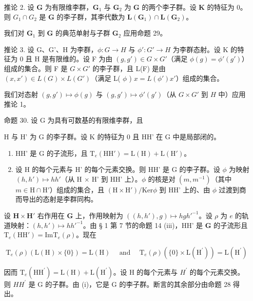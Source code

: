 推论 2. 设 \(\mathbf{G}\) 为有限维李群，\(\mathbf{G}_1\) 与 \(\mathbf{G}_2\) 为 \(\mathbf{G}\) 的两个李子群。设 \(\mathbf{K}\) 的特征为 0。则 \(G_1 \cap G_2\) 是 \(\mathbf{G}\) 的李子群，其李代数为 \(\mathbf{L}(\mathbf{G}_1) \cap \mathbf{L}(\mathbf{G}_2)\)。

我们对 \(\mathbf{G}_1\) 到 \(\mathbf{G}\) 的典范单射与子群 \(\mathbf{G}_2\) 应用命题 29。

推论 3. 设 G、G'、H 为李群，\(\phi: G \to H\) 与 \(\phi': G' \to H\) 为李群态射。设 K 的特征为 0 且 H 是有限维的。设 F 为由 \((g, g') \in G \times G'\)（满足 \(\phi(g) = \phi'(g')\)）组成的集合。则 F 是 \(G \times G'\) 的李子群，且 L(F) 是由 \((x, x') \in L(G) \times L(G')\)（满足 L( \(\phi\) ) \(x = L(\phi')x'\)）组成的集合。

我们对态射 \((g, g') \mapsto \phi(g)\) 与 \((g, g') \mapsto \phi'(g')\)（从 \(G \times G'\) 到 \(H\) 中）应用推论 1。

命题 30. 设 G 为具有可数基的有限维李群，且

H 与 H' 为 G 的李子群。设 K 的特征为 0 且 HH' 在 G 中是局部闭的。

\begin{enumerate}
\def\labelenumi{(\roman{enumi})}
\item
  HH' 是 G 的子流形，且 \(\mathrm{T}_{e}(\mathrm{HH}') = \mathrm{L}(\mathrm{H}) + \mathrm{L}(\mathrm{H}')\)。
\item
  设 H 的每个元素与 H' 的每个元素交换。则 HH' 是 G 的李子群。设 \(\phi\) 为映射 \((h, h') \mapsto hh'\)（从 H \(\times\) H' 到 HH' 上）。\(\phi\) 的核是对 \((m, m^{-1})\)（其中 \(m \in \mathrm{H} \cap \mathrm{H}'\)）组成的集合，且 \((\mathrm{H} \times \mathrm{H}') / \mathrm{Ker} \phi\) 到 HH' 上的、由 \(\phi\) 过渡到商而导出的态射是李群同构。
\end{enumerate}

设 \(\mathbf{H} \times \mathbf{H}'\) 右作用在 \(\mathbf{G}\) 上，作用映射为 \(((h, h'), g) \mapsto hgh'^{-1}\)。设 \(\rho\) 为 \(e\) 的轨道映射：\((h, h') \mapsto hh'^{-1}\)。由 § 1 第 7 节的命题 14 (iii)，HH' 是 \(\mathbf{G}\) 的子流形且 \(\mathrm{T}_e(\mathrm{HH}') = \mathrm{Im} \mathrm{T}_e(\rho)\)。现在

\[
\mathrm{T} _ {e} (\rho) (\mathrm{L} (\mathrm{H}) \times \{0 \}) = \mathrm{L} (\mathrm{H}) \quad \text { and } \quad \mathrm{T} _ {e} (\rho) (\{0 \} \times \mathrm{L} (\mathrm{H} ^ {\prime})) = \mathrm{L} (\mathrm{H} ^ {\prime})
\]

因而 \(\mathrm{T}_{e}(\mathrm{HH}^{\prime})=\mathrm{L}(\mathrm{H})+\mathrm{L}(\mathrm{H}^{\prime})\)。设 H 的每个元素与 \(H^{\prime}\) 的每个元素交换。则 \(HH^{\prime}\) 是 G 的子群。由 (i)，它是 G 的李子群。断言的其余部分由命题 28 得出。

